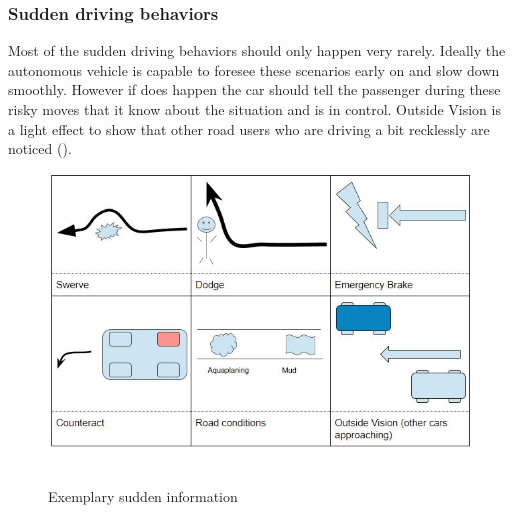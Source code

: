 \subsubsection{Sudden driving behaviors}
Most of the sudden driving behaviors should only happen very rarely. Ideally the autonomous vehicle is capable to foresee these scenarios early on and slow down smoothly. However if does happen the car should tell the passenger during these risky moves that it know about the situation and is in control. Outside Vision is a light effect to show that other road users who are driving a bit recklessly are noticed (). 
\begin{figure}
    \includegraphics[width=1\textwidth]{fig/sudden.JPG}\hfill\
    \caption[Sudden Information]{Exemplary sudden information}
    \label{fig:sudden}
\end{figure}
